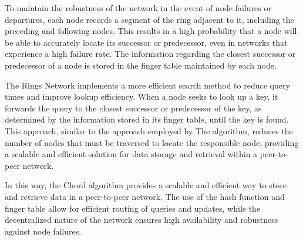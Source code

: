 \documentclass[twocolumn]{article}
\begin{document}
To maintain the robustness of the network in the event of node failures or departures, each node records a segment of the ring adjacent to it, including the preceding and following nodes. This results in a high probability that a node will be able to accurately locate its successor or predecessor, even in networks that experience a high failure rate. The information regarding the closest successor or predecessor of a node is stored in the finger table maintained by each node.

The Rings Network implements a more efficient search method to reduce query times and improve lookup efficiency. When a node seeks to look up a key, it forwards the query to the closest successor or predecessor of the key, as determined by the information stored in its finger table, until the key is found. This approach, similar to the approach employed by The algorithm, reduces the number of nodes that must be traversed to locate the responsible node, providing a scalable and efficient solution for data storage and retrieval within a peer-to-peer network.

In this way, the Chord algorithm provides a scalable and efficient way to store and retrieve data in a peer-to-peer network. The use of the hash function and finger table allow for efficient routing of queries and updates, while the decentralized nature of the network ensures high availability and robustness against node failures.
\end{document}
